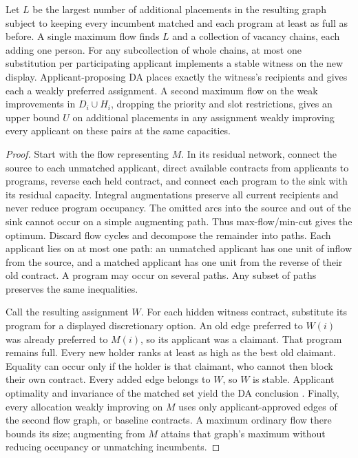 \begin{theorem}\label{thm:chain-flow}
Let $L$ be the largest number of additional placements in the resulting graph subject to keeping every incumbent matched and each program at least as full as before. A single maximum flow finds $L$ and a collection of vacancy chains, each adding one person. For any subcollection of whole chains, at most one substitution per participating applicant implements a stable witness on the new display. Applicant-proposing DA places exactly the witness's recipients and gives each a weakly preferred assignment. A second maximum flow on the weak improvements in $D_i\cup H_i$, dropping the priority and slot restrictions, gives an upper bound $U$ on additional placements in any assignment weakly improving every applicant on these pairs at the same capacities.
\end{theorem}
\begin{proof}
Start with the flow representing $M$. In its residual network, connect the source to each unmatched applicant, direct available contracts from applicants to programs, reverse each held contract, and connect each program to the sink with its residual capacity. Integral augmentations preserve all current recipients and never reduce program occupancy. The omitted arcs into the source and out of the sink cannot occur on a simple augmenting path. Thus max-flow/min-cut gives the optimum. Discard flow cycles and decompose the remainder into paths. Each applicant lies on at most one path: an unmatched applicant has one unit of inflow from the source, and a matched applicant has one unit from the reverse of their old contract. A program may occur on several paths. Any subset of paths preserves the same inequalities.

Call the resulting assignment $W$. For each hidden witness contract, substitute its program for a displayed discretionary option. An old edge preferred to $W(i)$ was already preferred to $M(i)$, so its applicant was a claimant. That program remains full. Every new holder ranks at least as high as the best old claimant. Equality can occur only if the holder is that claimant, who cannot then block their own contract. Every added edge belongs to $W$, so $W$ is stable. Applicant optimality and invariance of the matched set yield the DA conclusion \citep{gale1962,roth1986}. Finally, every allocation weakly improving on $M$ uses only applicant-approved edges of the second flow graph, or baseline contracts. A maximum ordinary flow there bounds its size; augmenting from $M$ attains that graph's maximum without reducing occupancy or unmatching incumbents.
\end{proof}

